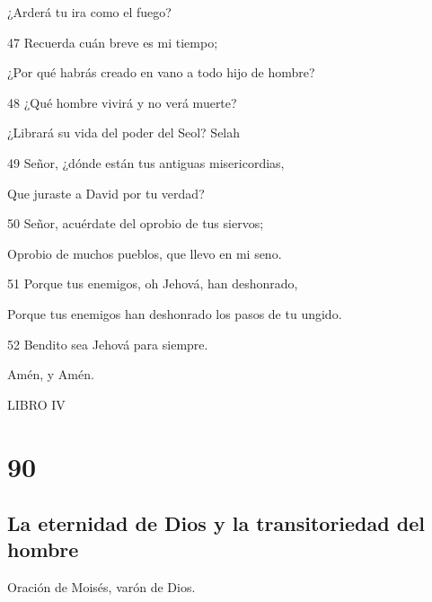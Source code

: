 \par ¿Arderá tu ira como el fuego?
\par 47 Recuerda cuán breve es mi tiempo;
\par ¿Por qué habrás creado en vano a todo hijo de hombre?
\par 48 ¿Qué hombre vivirá y no verá muerte?
\par ¿Librará su vida del poder del Seol? Selah
\par 49 Señor, ¿dónde están tus antiguas misericordias,
\par Que juraste a David por tu verdad?
\par 50 Señor, acuérdate del oprobio de tus siervos;
\par Oprobio de muchos pueblos, que llevo en mi seno.
\par 51 Porque tus enemigos, oh Jehová, han deshonrado,
\par Porque tus enemigos han deshonrado los pasos de tu ungido.
\par 52 Bendito sea Jehová para siempre.
\par Amén, y Amén.



\par LIBRO IV

\chapter{90}

\section*{La eternidad de Dios y la transitoriedad del hombre}

\par Oración de Moisés, varón de Dios.

